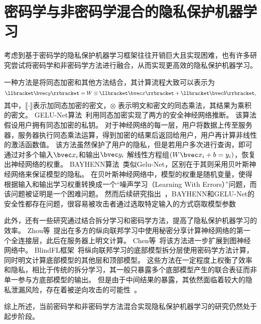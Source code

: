 \section{密码学与非密码学混合的隐私保护机器学习}
考虑到基于密码学的隐私保护机器学习框架往往开销巨大且实现困难，也有许多研究尝试将密码学和非密码学方法进行融合，从而实现更高效的隐私保护机器学习。
%

一种方法是将同态加密和其他方法结合，其计算流程大致可以表示为
\begin{equation}
    \llbracket \bvec y \rrbracket = W \otimes \llbracket \bvec x \rrbracket  + \llbracket \bvec b \rrbracket,
\end{equation}
其中，$\llbracket \cdot \rrbracket$表示加同态加密的密文，$\otimes$ 表示明文和密文的同态乘法，其结果为乘积的密文。
%
GELU-Net算法~\cite{zhangqiao_2018_gelu_net}利用同态加密实现了两方的安全神经网络推断。
该算法假设用户拥有同态加密的私钥。
对于神经网络的每一层，用户将数据上传至服务器，服务器执行同态乘法运算，得到加密的结果后返回给用户，用户再计算非线性的激活函数值。
%
该方法虽然保护了用户的隐私，但是若用户多次进行查询，即可通过对多个输入$\bvec x_i$和输出$\bvec y_i$ 解线性方程组$(W\bvec x_i + b = y_i)$，恢复出神经网络的权重。
%
BAYHENN算法~\cite{xiepeichen_2019_bayhenn}类似Gelu-Net，区别在于其则采用贝叶斯神经网络来保证模型的隐私。
在贝叶斯神经网络中，模型的权重是随机变量，使得根据输入和输出学习权重转换成一个“噪声学习（Learning With Errors）”问题，而该问题被证明是一个困难问题。
%
然而后续研究指出~\cite{wong_2020_lwe_model}，BAYHENN和GELU-Net的安全性都存在问题，很容易被攻击者通过选取特定输入的方式窃取模型参数

此外，还有一些研究通过结合拆分学习和密码学方法，提高了隐私保护机器学习的效率。
Zhou等~\cite{zhou_2022_codesign}提出在多方的纵向联邦学习中使用秘密分享计算神经网络的第一个全连接层，此后在服务器上明文计算。
Chen等~\cite{chen2020vertically}将该方法进一步扩展到图神经网络中。
%
BlindFL框架~\cite{fu2022blindfl}将纵向联邦学习的底部模型拆分层使用密码学方法计算，同时明文计算底部模型的其他层和顶部模型。
%
这些方法在一定程度上权衡了效率和隐私，相比于传统的拆分学习，其一般只暴露多个底部模型产生的联合表征而非单一参与方底部模型的输出。
%
但是由于中间结果的暴露，其依然面临着较大的隐私泄漏风险，存在着被逆向攻击的可能性~\cite{hezecheng_2019_model_inversion_attack,abuadbba2020can_split,luoxinjian2021feature_attack,erdogan2022unsplit,qiupengyu_2023_label_selling_you_out}。

综上所述，当前密码学和非密码学方法混合实现隐私保护机器学习的研究仍然处于起步阶段。
%
